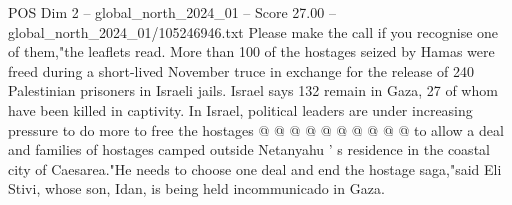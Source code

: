 \begin{textsample}{POS Dim 2 – global\_north\_2024\_01 – Score 27.00 – global\_north\_2024\_01/105246946.txt}
Please make the call if you recognise one of them,"the leaflets read.
More than 100 of the hostages seized by Hamas were freed during a short-lived November truce in exchange for the release of 240 Palestinian prisoners in Israeli jails.
Israel says 132 remain in Gaza, 27 of whom have been killed in captivity.
In Israel, political leaders are under increasing pressure to do more to free the hostages @ @ @ @ @ @ @ @ @ @ to allow a deal and families of hostages camped outside Netanyahu ' s residence in the coastal city of Caesarea."He needs to choose one deal and end the hostage saga,"said Eli Stivi, whose son, Idan, is being held incommunicado in Gaza.

\end{textsample}
